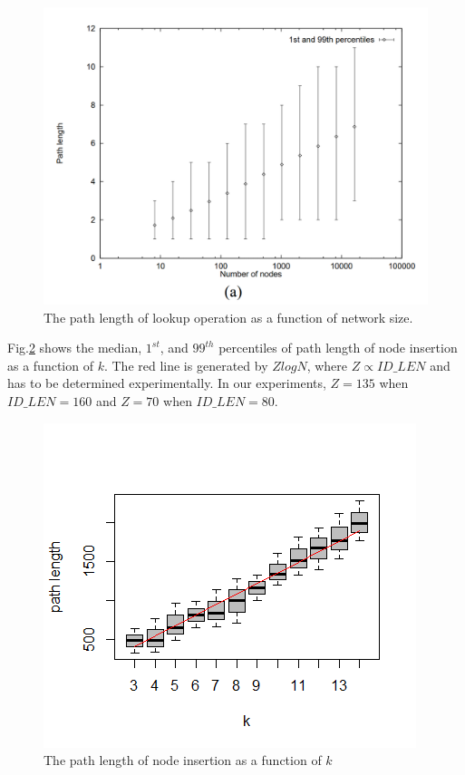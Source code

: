 \documentclass{article}
\begin{document}
\begin{figure}[H]
\centering
\includegraphics[scale=1]{oldlookup.PNG}
\caption{The path length of lookup operation as a function of network size.
\label{oldlookup}}
\end{figure}

Fig.\ref{insert} shows the median, $1^{st}$, and $99^{th}$ percentiles of path length of node insertion as a function of $k$. The red line is generated by $ZlogN$, where $Z \propto ID\_LEN$ and has to be determined experimentally. In our experiments, $Z=135$ when $ID\_LEN=160$ and $Z=70$ when $ID\_LEN=80$.

\begin{figure}[H]
\centering
\includegraphics[scale=1.2]{insertion.png}
\caption{The path length of node insertion as a function of $k$
\label{insert}}
\end{figure}







\end{document}
